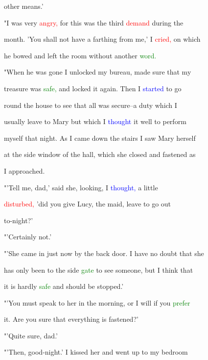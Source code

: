  other means.'



 "I was very \textcolor{red}{angry,} for this was the third \textcolor{red}{demand} during the

 month. 'You shall not have a farthing from me,' I \textcolor{red}{cried,} on which

 he bowed and left the room without another \textcolor{green}{word.}



 "When he was gone I unlocked my bureau, made sure that my

 \textcolor{BurntOrange}{treasure} was \textcolor{green}{safe,} and locked it again. Then I \textcolor{blue}{started} to go

 round the house to see that all was secure--a duty which I

 usually \textcolor{BurntOrange}{leave} to Mary but which I \textcolor{blue}{thought} it well to perform

 myself that night. As I came down the stairs I saw Mary herself

 at the side window of the hall, which she closed and fastened as

 I approached.



 "'Tell me, dad,' said she, looking, I \textcolor{blue}{thought,} a little

 \textcolor{red}{disturbed,} 'did you give Lucy, the maid, \textcolor{BurntOrange}{leave} to go out

 to-night?'



 "'Certainly not.'



 "'She came in just now by the back door. I have no \textcolor{BurntOrange}{doubt} that she

 has only been to the side \textcolor{green}{gate} to see someone, but I think that

 it is hardly \textcolor{green}{safe} and should be stopped.'



 "'You must speak to her in the morning, or I will if you \textcolor{green}{prefer}

 it. Are you sure that everything is fastened?'



 "'Quite sure, dad.'



 "'Then, good-night.' I \textcolor{BurntOrange}{kissed} her and went up to my bedroom

